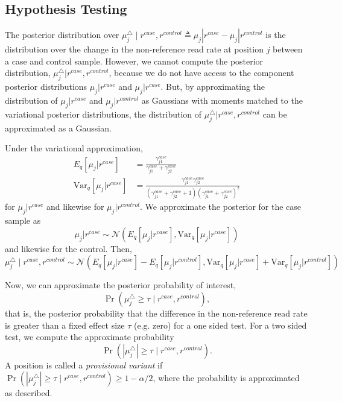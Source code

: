 \documentclass{bmcart}
\begin{document}
\subsection*{Hypothesis Testing}
The posterior distribution over $\mu_j^{\triangle} \mid r^{case}, r^{control} \triangleq \mu_j|r^{case} - \mu_j|r^{control}$ is the distribution over the change in the non-reference read rate at position $j$ between a case and control sample.
However, we cannot compute the posterior distribution, $\mu_j^{\triangle} | r^{case}, r^{control}$, because we do not have access to the component posterior distributions $\mu_j|r^{case}$ and $\mu_j|r^{case}$.
But, by approximating the distribution of $\mu_j|r^{case}$ and $\mu_j|r^{control}$ as Gaussians with moments matched to the variational posterior distributions, the distribution of $\mu_j^{\triangle} | r^{case}, r^{control}$ can be approximated as a Gaussian.

Under the variational approximation,
\begin{align}
  E_q[\mu_j|r^{case}] &= \frac{\gamma_{j1}^{case}}{\gamma_{j1}^{case} + \gamma_{j2}^{case}}
  \\
  \text{Var}_q[\mu_j|r^{case}] &= \frac{\gamma_{j1}^{case} \gamma_{j2}^{case}}{(\gamma_{j1}^{case} + \gamma_{j2}^{case} + 1)(\gamma_{j1}^{case} + \gamma_{j2}^{case})^2}
\end{align}
for $\mu_j|r^{case}$ and likewise for $\mu_j|r^{control}$.
We approximate the posterior for the case sample as
\begin{equation}
  \mu_j | r^{case} \sim \mathcal{N}(E_q[\mu_j|r^{case}], \text{Var}_q[\mu_j|r^{case}])
\end{equation}
and likewise for the control.
Then,
\begin{equation}
  \mu_j^{\triangle} \mid r^{case}, r^{control} \sim \mathcal{N}(E_q[\mu_j|r^{case}] - E_q[\mu_j|r^{control}], \text{Var}_q[\mu_j|r^{case}] + \text{Var}_q[\mu_j|r^{control}])
\end{equation}

Now, we can approximate the posterior probability of interest,
\begin{equation}
  \Pr( \mu_j^{\triangle} \geq \tau \mid r^{case}, r^{control} ),
\end{equation}
that is, the posterior probability that the difference in the non-reference read rate is greater than a fixed effect size $\tau$ (e.g. zero) for a one sided test.
For a two sided test, we compute the approximate probability
\begin{equation}
  \Pr( | \mu_j^{\triangle} | \geq \tau \mid r^{case}, r^{control}).
\end{equation}
A position is called a \textit{provisional variant} if $\Pr( | \mu_j^{\triangle} | \geq \tau \mid r^{case}, r^{control}) \geq 1-\alpha/2$, where the probability is approximated as described.
\end{document}
